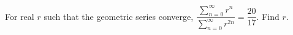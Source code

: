 For real $ r $ such that the geometric series converge, $\dfrac{\sum_{n=0}^{\infty}r^n}{\sum_{n=0}^{\infty}r^{2n}}=\dfrac{20}{17}$. Find $ r $.
